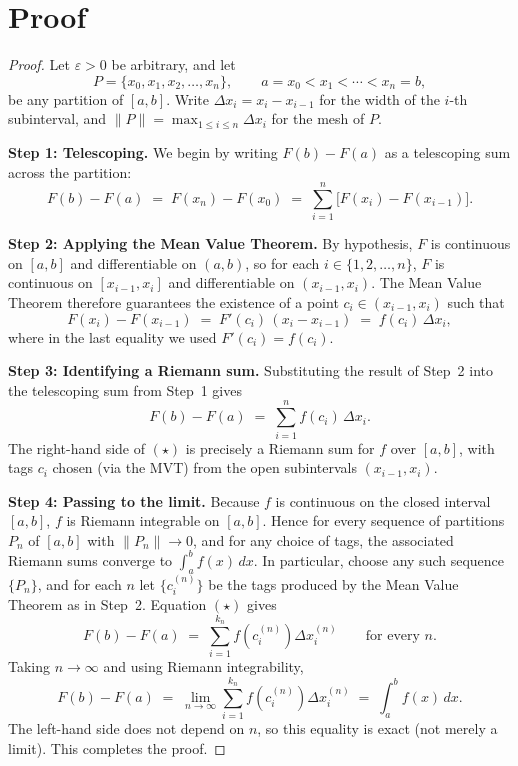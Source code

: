 \documentclass{article}
\theoremstyle{remark}
\begin{document}
\section*{Proof}

\begin{proof}
Let $\varepsilon > 0$ be arbitrary, and let
\[
P = \{x_0, x_1, x_2, \ldots, x_n\}, \qquad a = x_0 < x_1 < \cdots < x_n = b,
\]
be any partition of $[a,b]$. Write $\Delta x_i = x_i - x_{i-1}$ for the width of the $i$-th subinterval, and $\|P\| = \max_{1 \le i \le n} \Delta x_i$ for the mesh of $P$.

\textbf{Step 1: Telescoping.} We begin by writing $F(b) - F(a)$ as a telescoping sum across the partition:
\[
F(b) - F(a) \;=\; F(x_n) - F(x_0) \;=\; \sum_{i=1}^{n} \bigl[F(x_i) - F(x_{i-1})\bigr].
\]

\textbf{Step 2: Applying the Mean Value Theorem.} By hypothesis, $F$ is continuous on $[a,b]$ and differentiable on $(a,b)$, so for each $i \in \{1, 2, \ldots, n\}$, $F$ is continuous on $[x_{i-1}, x_i]$ and differentiable on $(x_{i-1}, x_i)$. The Mean Value Theorem therefore guarantees the existence of a point $c_i \in (x_{i-1}, x_i)$ such that
\[
F(x_i) - F(x_{i-1}) \;=\; F'(c_i)\,(x_i - x_{i-1}) \;=\; f(c_i)\,\Delta x_i,
\]
where in the last equality we used $F'(c_i) = f(c_i)$.

\textbf{Step 3: Identifying a Riemann sum.} Substituting the result of Step~2 into the telescoping sum from Step~1 gives
\begin{equation}
F(b) - F(a) \;=\; \sum_{i=1}^{n} f(c_i)\,\Delta x_i. \tag{$\star$}
\end{equation}
The right-hand side of $(\star)$ is precisely a Riemann sum for $f$ over $[a,b]$, with tags $c_i$ chosen (via the MVT) from the open subintervals $(x_{i-1}, x_i)$.

\textbf{Step 4: Passing to the limit.} Because $f$ is continuous on the closed interval $[a,b]$, $f$ is Riemann integrable on $[a,b]$. Hence for every sequence of partitions $P_n$ of $[a,b]$ with $\|P_n\| \to 0$, and for any choice of tags, the associated Riemann sums converge to $\int_a^b f(x)\,dx$. In particular, choose any such sequence $\{P_n\}$, and for each $n$ let $\{c_i^{(n)}\}$ be the tags produced by the Mean Value Theorem as in Step~2. Equation $(\star)$ gives
\[
F(b) - F(a) \;=\; \sum_{i=1}^{k_n} f\!\left(c_i^{(n)}\right) \Delta x_i^{(n)} \qquad \text{for every } n.
\]
Taking $n \to \infty$ and using Riemann integrability,
\[
F(b) - F(a) \;=\; \lim_{n \to \infty} \sum_{i=1}^{k_n} f\!\left(c_i^{(n)}\right) \Delta x_i^{(n)} \;=\; \int_a^b f(x)\,dx.
\]
The left-hand side does not depend on $n$, so this equality is exact (not merely a limit). This completes the proof.
\end{proof}
\end{document}
